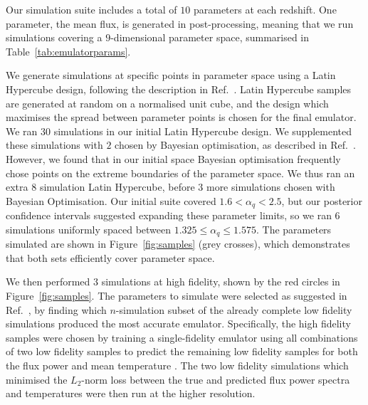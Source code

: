 \documentclass[a4paper,11pt]{article}
\begin{document}

Our simulation suite includes a total of $10$ parameters at each redshift. One parameter, the mean flux, is generated in post-processing, meaning that we run simulations covering a $9$-dimensional parameter space, summarised in Table~\ref{tab:emulatorparams}.

We generate simulations at specific points in parameter space using a Latin Hypercube design, following the description in Ref.~\cite{Bird:2019}. Latin Hypercube samples are generated at random on a normalised unit cube, and the design which maximises the spread between parameter points is chosen for the final emulator. We ran $30$ simulations in our initial Latin Hypercube design. We supplemented these simulations with $2$ chosen by Bayesian optimisation, as described in Ref.~\cite{Rogers:2019}.
However, we found that in our initial space Bayesian optimisation frequently chose points on the extreme boundaries of the parameter space.
We thus ran an extra $8$ simulation Latin Hypercube, before $3$ more simulations chosen with Bayesian Optimisation. Our initial suite covered $1.6 < \alpha_q < 2.5$, but our posterior confidence intervals suggested expanding these parameter limits, so we ran $6$ simulations uniformly spaced between $1.325 \leq \alpha_q \leq 1.575$. The parameters simulated are shown in Figure~\ref{fig:samples} (grey crosses), which demonstrates that both sets efficiently cover parameter space.

We then performed $3$ simulations at high fidelity, shown by the red circles in Figure~\ref{fig:samples}. The parameters to simulate were selected as suggested in Ref.~\cite{Ho:2022,Fernandez:2022}, by finding which $n$-simulation subset of the already complete low fidelity simulations produced the most accurate emulator. Specifically, the high fidelity samples were chosen by training a single-fidelity emulator using all combinations of two low fidelity samples to predict the remaining low fidelity samples for both the flux power and mean temperature \cite{Ho:2022}. The two low fidelity simulations which minimised the $L_2$-norm loss between the true and predicted flux power spectra and temperatures were then run at the higher resolution.
\end{document}
